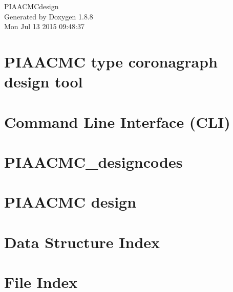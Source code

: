 \documentclass[twoside]{book}
\newcommand{\+}{\discretionary{\mbox{\scriptsize$\hookleftarrow$}}{}{}}
\newcommand{\clearemptydoublepage}{%
  \newpage{\pagestyle{empty}\cleardoublepage}%
}
\begin{document}
\hypersetup{pageanchor=false,
             bookmarks=true,
             bookmarksnumbered=true,
             pdfencoding=unicode
            }
\begin{titlepage}
\vspace*{7cm}
\begin{center}%
{\Large P\+I\+A\+A\+C\+M\+Cdesign }\\
\vspace*{1cm}
{\large Generated by Doxygen 1.8.8}\\
\vspace*{0.5cm}
{\small Mon Jul 13 2015 09:48:37}\\
\end{center}
\end{titlepage}
\clearemptydoublepage
\tableofcontents
\clearemptydoublepage
{}
\hypersetup{pageanchor=true}

\chapter{P\+I\+A\+A\+C\+M\+C type coronagraph design tool}
\label{md_README}
\hypertarget{md_README}{}

\chapter{Command Line Interface (C\+L\+I)}
\label{md_src_CLIcore}
\hypertarget{md_src_CLIcore}{}

\chapter{P\+I\+A\+A\+C\+M\+C\+\_\+designcodes}
\label{md_src_PIAACMCsimul_PIAACMC_designcodes}
\hypertarget{md_src_PIAACMCsimul_PIAACMC_designcodes}{}

\chapter{P\+I\+A\+A\+C\+M\+C design}
\label{md_src_PIAACMCsimul_README}
\hypertarget{md_src_PIAACMCsimul_README}{}

\chapter{Data Structure Index}

\chapter{File Index}

\end{document}
